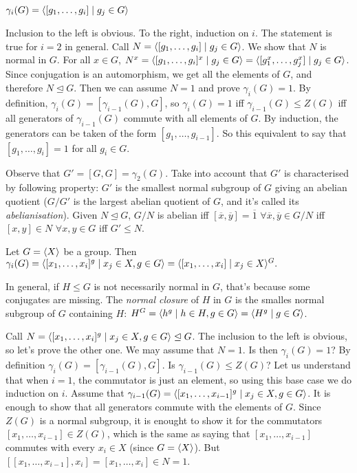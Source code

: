 \documentclass[twoside, 11pt]{article}
\begin{document}
\begin{teorema}
$\gamma_i(G)=\langle{[g_1,\dots, g_i]\mid g_j\in G}\rangle$
\end{teorema}
\begin{dem}
Inclusion to the left is obvious. To the right, induction on $i$. The statement is true for $i=2$ in general. Call $N=\langle{[g_1,\dots, g_i]\mid g_j\in G}\rangle$. We show that $N$ is normal in $G$. For all $x\in G$, $N^x=\langle{[g_1,\dots, g_i]^x\mid g_j\in G}\rangle=\langle{[g_1^x,\dots, g_j^x]\mid g_j\in G}\rangle$. Since conjugation is an automorphism, we get all the elements of $G$, and therefore $N\trianglelefteq G$. Then we can assume $N=1$ and prove $\gamma_i(G)=1$. By definition, $\gamma_i(G)=[\gamma_{i-1}(G),G]$, so $\gamma_i(G)=1$ iff $\gamma_{i-1}(G)\leq Z(G)$ iff all generators of $\gamma_{i-1}(G)$ commute with all elements of $G$. By induction, the generators can be taken of the form $[g_1,\dots, g_{i-1}]$. So this equivalent to say that $[g_1,\dots, g_i]=1$ for all $g_i\in G$. 
\end{dem}

Observe that $G'=[G,G]=\gamma_2(G)$. Take into account that $G'$ is characterised by following property: $G'$ is the smallest normal subgroup of $G$ giving an abelian quotient ($G/G'$ is the largest abelian quotient of $G$, and it's called its \emph{abelianisation}). Given $N\trianglelefteq G$, $G/N$ is abelian iff $[\overline{x},\overline{y}]=\overline{1}$ $\forall \overline{x},\overline{y}\in G/N$ iff $[x,y]\in N$ $\forall x,y\in G$ iff $G'\leq N$. 

\begin{teorema}
Let $G=\langle{X}\rangle$ be a group. Then $\gamma_i(G)=\langle{[x_1,\dots, x_i]^g\mid x_j\in X, g\in G}\rangle=\langle{[x_1,\dots, x_i]\mid x_j\in X}\rangle^G.$
\end{teorema}

In general, if $H\leq G$ is not necessarily normal in $G$, that's because some conjugates are missing. The \emph{normal closure} of $H$ in $G$ is the smalles normal subgroup of $G$ containing $H$: $H^G=\langle{h^g\mid h\in H,g\in G}\rangle=\langle{H^g\mid g\in G}\rangle$. 

\begin{dem}
Call $N=\langle{[x_1,\dots, x_i]^g\mid x_j\in X, g\in G}\rangle\trianglelefteq G$. The inclusion to the left is obvious, so let's prove the other one. We may assume that $N=1$. Is then $\gamma_i(G)=1$? By definition $\gamma_i(G)=[\gamma_{i-1}(G),G]$. Is $\gamma_{i-1}(G)\leq Z(G)$? Let us understand that when $i=1$, the commutator is just an element, so using this base case we do induction on $i$. Assume that $\gamma_{i-1}(G)=\langle{[x_1,\dots, x_{i-1}]^g\mid x_j\in X,g\in G}\rangle$. It is enough to show that all generators commute with the elements of $G$. Since $Z(G)$ is a normal subgroup, it is enought to show it for the commutators $[x_1,\dots, x_{i-1}]\in Z(G)$, which is the same as saying that $[x_1,\dots, x_{i-1}]$ commutes with every $x_i\in X$ (since $G=\langle{X}\rangle$). But $[[x_1,\dots, x_{i-1}],x_i]=[x_1,\dots, x_i]\in N=1$. 



\end{dem}
\end{document}
